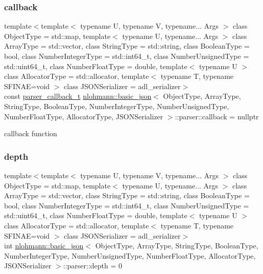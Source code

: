 \subsubsection{\texorpdfstring{callback}{callback}}
{\footnotesize\ttfamily template$<$template$<$ typename U, typename V, typename... Args $>$ class Object\+Type = std\+::map, template$<$ typename U, typename... Args $>$ class Array\+Type = std\+::vector, class String\+Type  = std\+::string, class Boolean\+Type  = bool, class Number\+Integer\+Type  = std\+::int64\+\_\+t, class Number\+Unsigned\+Type  = std\+::uint64\+\_\+t, class Number\+Float\+Type  = double, template$<$ typename U $>$ class Allocator\+Type = std\+::allocator, template$<$ typename T, typename S\+F\+I\+N\+A\+E=void $>$ class J\+S\+O\+N\+Serializer = adl\+\_\+serializer$>$ \\
const \hyperlink{classnlohmann_1_1basic__json_aecae491e175f8767c550ae3c59e180e3}{parser\+\_\+callback\+\_\+t} \hyperlink{classnlohmann_1_1basic__json}{nlohmann\+::basic\+\_\+json}$<$ Object\+Type, Array\+Type, String\+Type, Boolean\+Type, Number\+Integer\+Type, Number\+Unsigned\+Type, Number\+Float\+Type, Allocator\+Type, J\+S\+O\+N\+Serializer $>$\+::parser\+::callback = nullptr\hspace{0.3cm}{\ttfamily [private]}}



callback function 

\mbox{\label{classnlohmann_1_1basic__json_1_1parser_af10c872a9549a4d5aa3775ffdbb09e4c}} 
\subsubsection{\texorpdfstring{depth}{depth}}
{\footnotesize\ttfamily template$<$template$<$ typename U, typename V, typename... Args $>$ class Object\+Type = std\+::map, template$<$ typename U, typename... Args $>$ class Array\+Type = std\+::vector, class String\+Type  = std\+::string, class Boolean\+Type  = bool, class Number\+Integer\+Type  = std\+::int64\+\_\+t, class Number\+Unsigned\+Type  = std\+::uint64\+\_\+t, class Number\+Float\+Type  = double, template$<$ typename U $>$ class Allocator\+Type = std\+::allocator, template$<$ typename T, typename S\+F\+I\+N\+A\+E=void $>$ class J\+S\+O\+N\+Serializer = adl\+\_\+serializer$>$ \\
int \hyperlink{classnlohmann_1_1basic__json}{nlohmann\+::basic\+\_\+json}$<$ Object\+Type, Array\+Type, String\+Type, Boolean\+Type, Number\+Integer\+Type, Number\+Unsigned\+Type, Number\+Float\+Type, Allocator\+Type, J\+S\+O\+N\+Serializer $>$\+::parser\+::depth = 0\hspace{0.3cm}{\ttfamily [private]}}



